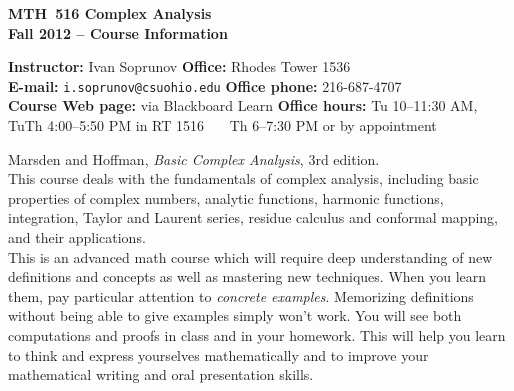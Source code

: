 \documentclass[11pt]{article}
\begin{document}
\begin{center}
{\noindent \bf \large MTH~516 Complex Analysis\\
 Fall 2012 -- Course Information\\
}
\end{center}

\medskip

\begin{tabbing}
{\bf Instructor:} Ivan Soprunov \hspace{1.5in} \=
{\bf Office:} Rhodes Tower 1536\\ 
{\bf E-mail:} {\tt i.soprunov@csuohio.edu} \>
{\bf Office phone:} 216-687-4707\\ 
{\bf Course Web page:}  via Blackboard Learn  \> 
{\bf Office hours:} Tu 10--11:30 AM,\\ 

 TuTh 4:00--5:50 PM in
RT 1516  \> \ \ \ Th 6--7:30 PM or by appointment\\
\end{tabbing}

\vspace{-.5cm}

 Marsden and Hoffman, {\it
  Basic Complex Analysis}, 3rd edition. \\



 
  This course deals with the fundamentals of complex analysis, including basic properties of complex numbers, analytic functions, harmonic functions, integration, Taylor and Laurent series, residue calculus and conformal mapping, and their applications.\\
 
 This is an advanced math course which will require
deep understanding of new definitions and concepts as well as mastering new techniques. 
When you learn them, pay particular attention to {\it concrete examples}.
Memorizing definitions without being able to give examples simply won't work.
You will see both computations and proofs in class and in your homework.
This will help you learn to think and express yourselves mathematically and 
to improve your mathematical writing and oral presentation skills.\\
\end{document}
